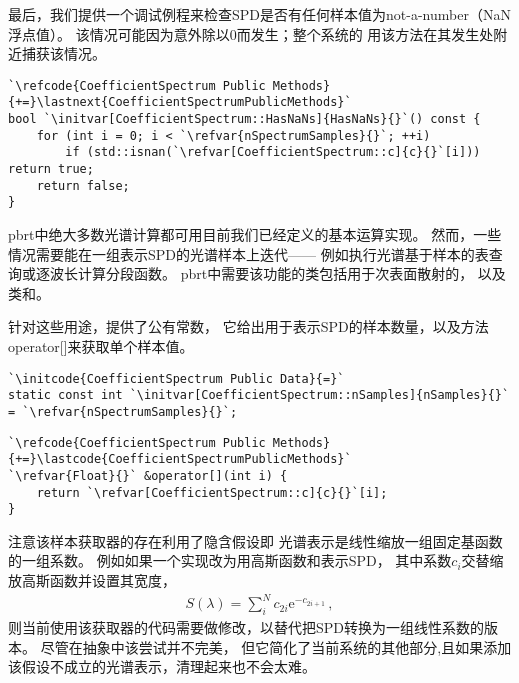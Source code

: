 最后，我们提供一个调试例程来检查SPD是否有任何样本值为not-a-number（NaN浮点值）。
该情况可能因为意外除以0而发生；整个系统的
用该方法在其发生处附近捕获该情况。
\begin{lstlisting}
`\refcode{CoefficientSpectrum Public Methods}{+=}\lastnext{CoefficientSpectrumPublicMethods}` 
bool `\initvar[CoefficientSpectrum::HasNaNs]{HasNaNs}{}`() const {
    for (int i = 0; i < `\refvar{nSpectrumSamples}{}`; ++i)
        if (std::isnan(`\refvar[CoefficientSpectrum::c]{c}{}`[i])) return true;
    return false;
}
\end{lstlisting}

pbrt中绝大多数光谱计算都可用目前我们已经定义的基本运算实现。
然而，一些情况需要能在一组表示SPD的光谱样本上迭代——
例如执行光谱基于样本的表查询或逐波长计算分段函数。
pbrt中需要该功能的类包括用于次表面散射的，
以及类和。

针对这些用途，提供了公有常数，
它给出用于表示SPD的样本数量，以及方法{\ttfamily operator[]}来获取单个样本值。
\begin{lstlisting}
`\initcode{CoefficientSpectrum Public Data}{=}`
static const int `\initvar[CoefficientSpectrum::nSamples]{nSamples}{}` = `\refvar{nSpectrumSamples}{}`;
\end{lstlisting}
\begin{lstlisting}
`\refcode{CoefficientSpectrum Public Methods}{+=}\lastcode{CoefficientSpectrumPublicMethods}`
`\refvar{Float}{}` &operator[](int i) {
    return `\refvar[CoefficientSpectrum::c]{c}{}`[i];
}
\end{lstlisting}

注意该样本获取器的存在利用了隐含假设即
光谱表示是线性缩放一组固定基函数的一组系数。
例如如果一个实现改为用高斯函数和表示SPD，
其中系数$c_i$交替缩放高斯函数并设置其宽度，
\begin{align*}
    S(\lambda)=\sum\limits_i^N{c_{2i}\mathrm{e}^{-c_{2i+1}}}\, ,
\end{align*}
则当前使用该获取器的代码需要做修改，以替代把SPD转换为一组线性系数的版本。
尽管在抽象中该尝试并不完美，
但它简化了当前系统的其他部分,且如果添加该假设不成立的光谱表示，清理起来也不会太难。